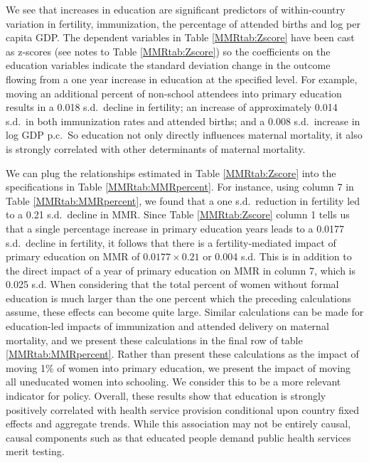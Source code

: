 \documentclass{article}[12pt,subeqn]
\begin{document}
\begin{spacing}{1.4}
We see that increases in education are significant predictors of within-country 
variation in fertility, immunization, the percentage of attended births and log 
per capita GDP. The dependent variables in Table \ref{MMRtab:Zscore} have been 
cast as z-scores (see notes to Table \ref{MMRtab:Zscore}) so the coefficients on 
the education variables indicate the standard deviation change in the outcome 
flowing from a one year increase in education at the specified level. For 
example, moving an additional percent of non-school attendees into primary 
education results in a 0.018 s.d.\ decline in fertility; an increase of 
approximately 0.014 s.d.\ in both immunization rates and attended births; and a 
0.008 s.d.\ increase in log GDP p.c.\ So education not only directly influences 
maternal mortality, it also is strongly correlated with other determinants of 
maternal mortality.

We can plug the relationships estimated in Table \ref{MMRtab:Zscore} into the 
specifications in Table \ref{MMRtab:MMRpercent}. For instance, using column 7 
in Table \ref{MMRtab:MMRpercent}, we found that a one s.d.\ reduction in 
fertility led to a 0.21 s.d.\ decline in MMR. Since Table \ref{MMRtab:Zscore} 
column 1 tells us that a single percentage increase in primary education years 
leads to a 0.0177 s.d.\ decline in fertility, it follows that there is a 
fertility-mediated impact of primary education on MMR of $0.0177\times 0.21$ or 
0.004 s.d. This is in addition to the direct impact of a year of primary 
education on MMR in column 7, which is 0.025 s.d. When considering that the total 
percent of women without formal education is much larger than the one percent 
which the preceding calculations assume, these effects can become quite large. 
Similar calculations can be made for education-led impacts of immunization and 
attended delivery on maternal mortality, and we present these calculations in the 
final row of table \ref{MMRtab:MMRpercent}. Rather than present these 
calculations as the impact of moving 1\% of women into primary education, we 
present the impact of moving all uneducated women into schooling. We consider 
this to be a more relevant indicator for policy. Overall, these results show that 
education is strongly positively correlated with health service provision 
conditional upon country fixed effects and aggregate trends. While this 
association may not be entirely causal, causal components such as that educated 
people demand public health services merit testing.


\end{spacing}
\end{document}
